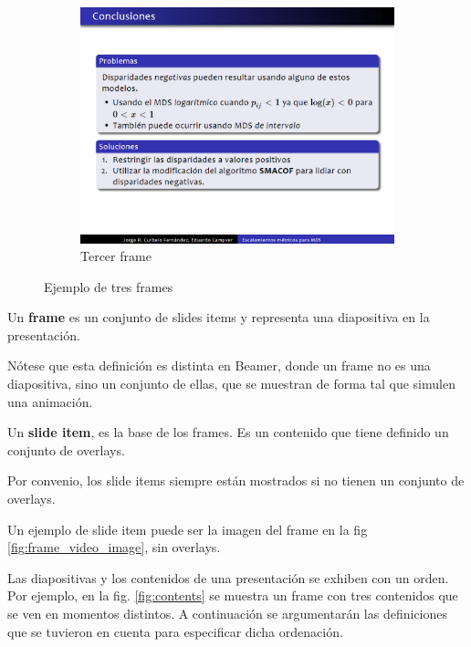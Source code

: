\begin{figure}[tb]
\begin{subfigure}[b]{0.3\textwidth}
 				\includegraphics[width=\textwidth]{img/f3}
 				\caption{Tercer frame}
 				\label{fig:frames_c}	
 			\end{subfigure}			 			
 			\caption{Ejemplo de tres frames}
 			\label{fig:frames}
 		\end{figure}

 		\begin{definition}
 		\label{def:frame}
			Un \textbf{frame} es un conjunto de slides items y representa una diapositiva en la presentación. 
 		\end{definition}

 		Nótese que esta definición es distinta en Beamer, donde un frame no es una diapositiva, sino un conjunto de ellas, que se muestran de forma tal que simulen una animación.

 		\begin{definition}
 		\label{def:slide_item}
 			Un \textbf{slide item}, es la base de los frames. Es un contenido que tiene definido un conjunto de overlays. 
 		\end{definition}

 		Por convenio, los slide items siempre están mostrados si no tienen un conjunto de overlays.

		Un ejemplo de slide item puede ser la imagen del frame en la fig \ref{fig:frame_video_image}, sin overlays.

		Las diapositivas y los contenidos de una presentación se exhiben con un orden. Por ejemplo, en la fig. \ref{fig:contents} se muestra un frame con tres contenidos que se ven en momentos distintos. A continuación se argumentarán las definiciones que se tuvieron en cuenta para especificar dicha ordenación.

